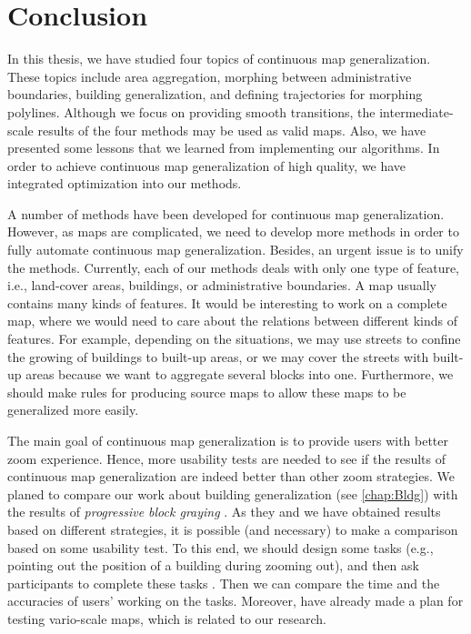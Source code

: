 \chapter{Conclusion}
\label{chap:Conclusion}

In this thesis, we have studied four topics of 
continuous map generalization.
These topics include area aggregation, 
morphing between administrative boundaries,
building generalization, and
defining trajectories for morphing polylines.
Although we focus on providing smooth transitions,
the intermediate-scale results of the four methods
may be used as valid maps.
Also, we have presented some lessons that 
we learned from implementing our algorithms.
In order to achieve continuous map generalization 
of high quality, 
we have integrated optimization into our methods.

A number of methods have been developed for
continuous map generalization.
However, as maps are complicated,
we need to develop more methods 
in order to fully automate continuous map generalization.
Besides, an urgent issue is to unify the methods.
Currently, each of our methods deals with 
only one type of feature, i.e., 
land-cover areas, buildings, or administrative boundaries.
A map usually contains many kinds of features.
It would be interesting to work on a complete map,
where we would need to care about the relations 
between different kinds of features.
For example, depending on the situations, 
we may use streets to confine the growing of 
buildings to built-up areas, 
or we may cover the streets with built-up areas 
because we want to aggregate several blocks into one.
Furthermore, we should make rules for producing source maps
to allow these maps to be generalized more easily.

The main goal of continuous map generalization is to provide 
users with better zoom experience.
Hence, more usability tests are needed to see 
if the results of continuous map generalization 
are indeed better than other zoom strategies.
We planed to compare our work about building generalization 
(see \chap\ref{chap:Bldg}) 
with the results of \emph{progressive block graying} 
\parencite[see][]{Touya2017Progressive}.
As they and we have obtained results 
based on different strategies, 
it is possible (and necessary) to make a comparison 
based on some usability test.
To this end, we should design some tasks 
(e.g., pointing out the 
position of a building during zooming out), 
and then ask participants to complete these tasks
\parencite[e.g.,][]{Midtbo2007}.
Then we can compare the time and the accuracies
of users' working on the tasks.
Moreover, \textcite{Suba2016Usability} 
have already made a plan for 
testing vario-scale maps, which is related to our research.


